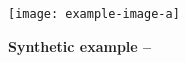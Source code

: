 \begin{figure}
    \centering
    \texttt{[image: example-image-a]}
    \caption{{\bf Synthetic example -- }
    }
    \label{fig:kubric2d}
\end{figure}